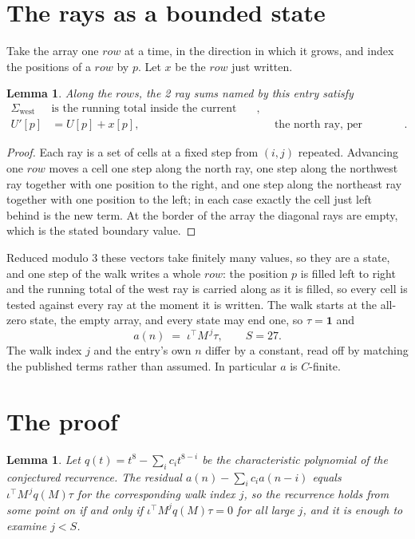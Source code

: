 \documentclass[11pt,a4paper]{article}
\theoremstyle{plain}
\newtheorem{lemma}[theorem]{Lemma}
\theoremstyle{definition}
\begin{document}
\section{The rays as a bounded state}

Take the array one $row$ at a time, in the direction in which it grows, and index the
positions of a $row $ by $p$. Let $x$ be the $row$ just written.

\begin{lemma}\label{lem:rays}
Along the $row$s, the 2 ray sums named by this entry satisfy
\[
\begin{aligned}
\Sigma_{\mathrm{west}}\ &\text{is the running total inside the current row},\\
U'[p]&=U[p]+x[p], &&\text{the north ray, per position} .
\end{aligned}
\]
\end{lemma}

\begin{proof}
Each ray is a set of cells at a fixed step from $(i,j)$ repeated. Advancing one $row$
moves a cell one step along the north ray, one step along the northwest ray together with one
position to the right, and one step along the northeast ray together with one position to the
left; in each case exactly the cell just left behind is the new term. At the border of the
array the diagonal rays are empty, which is the stated boundary value.
\end{proof}

Reduced modulo $3$ these vectors take finitely many values, so they are a state, and one step
of the walk writes a whole $row$: the position $p$ is filled left to right and the
running total of the west ray is carried along as it is filled, so every cell is tested
against every ray at the moment it is written. The walk starts at the all-zero state, the empty
array, and every state may end one, so $\tau=\mathbf{1}$ and
\[
a(n)\;=\;\iota^{\!\top}M^{\,j}\tau ,\qquad S=27.
\]
The walk index $j$ and the entry's own $n$ differ by a constant, read off by matching the
published terms rather than assumed. In particular $a$ is $C$-finite.

\section{The proof}

\begin{lemma}\label{lem:crit}
Let $q(t)=t^{8}-\sum_i c_it^{8-i}$ be the characteristic polynomial of the
conjectured recurrence. The residual $a(n)-\sum_ic_ia(n-i)$ equals
$\iota^{\!\top}M^{\,j}q(M)\tau$ for the corresponding walk index $j$, so the recurrence
holds from some point on if and only if $\iota^{\!\top}M^{j}q(M)\tau=0$ for all large $j$,
and it is enough to examine $j<S$.
\end{lemma}
\end{document}
